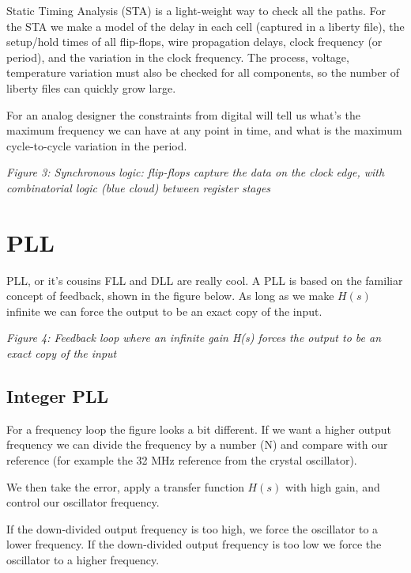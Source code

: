 Static Timing Analysis (STA) is a light-weight way to check all the
paths. For the STA we make a model of the delay in each cell (captured
in a liberty file), the setup/hold times of all flip-flops, wire
propagation delays, clock frequency (or period), and the variation in
the clock frequency. The process, voltage, temperature variation must
also be checked for all components, so the number of liberty files can
quickly grow large.

For an analog designer the constraints from digital will tell us what's
the maximum frequency we can have at any point in time, and what is the
maximum cycle-to-cycle variation in the period.


{
\centering
{}
}

\emph{Figure 3: Synchronous logic: flip-flops capture the data on the
clock edge, with combinatorial logic (blue cloud) between register
stages}

\section{PLL}\label{pll}

PLL, or it's cousins FLL and DLL are really cool. A PLL is based on the
familiar concept of feedback, shown in the figure below. As long as we
make \(H(s)\) infinite we can force the output to be an exact copy of
the input.


{
\centering
{}
}

\emph{Figure 4: Feedback loop where an infinite gain H(s) forces the
output to be an exact copy of the input}

\subsection{Integer PLL}\label{integer-pll}

For a frequency loop the figure looks a bit different. If we want a
higher output frequency we can divide the frequency by a number (N) and
compare with our reference (for example the 32 MHz reference from the
crystal oscillator).

We then take the error, apply a transfer function \(H(s)\) with high
gain, and control our oscillator frequency.

If the down-divided output frequency is too high, we force the
oscillator to a lower frequency. If the down-divided output frequency is
too low we force the oscillator to a higher frequency.

